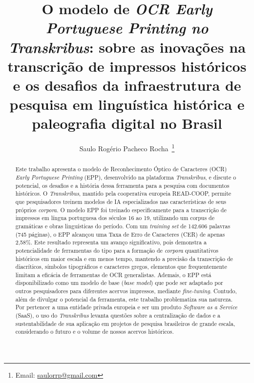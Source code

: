 \documentclass[portuguese]{textolivre}
\title{O modelo de \textit{OCR Early Portuguese Printing no Transkribus}: sobre as inovações na transcrição de impressos históricos e os desafios da infraestrutura de pesquisa em linguística histórica e paleografia digital no Brasil}
\author[1]{Saulo Rogério Pacheco Rocha~\orcid{0000-0003-3715-6706}\thanks{Email: \href{mailto:saulorrp@gmail.com}{saulorrp@gmail.com}}}
\affil[1]{Universidade Federal de Santa Catarina, Centro de Comunicação e Expressão, Programa de Pós-Graduação em Linguística, Florianópolis, SC, Brasil.}
\begin{document}
\maketitle

\begin{polyabstract}
\begin{abstract}
Este trabalho apresenta o modelo de Reconhecimento Óptico de Caracteres (OCR) \textit{Early Portuguese Printing} (EPP), desenvolvido na plataforma \textit{Transkribus}, e discute o potencial, os desafios e a história dessa ferramenta para a pesquisa com documentos históricos. O \textit{Transkribus}, mantido pela cooperativa europeia READ-COOP, permite que pesquisadores treinem modelos de IA especializados nas características de seus próprios \textit{corpora}. O modelo EPP foi treinado especificamente para a transcrição de impressos em língua portuguesa dos séculos 16 ao 19, utilizando um corpus de gramáticas e obras linguísticas do período. Com um \textit{training set} de 142.606 palavras (745 páginas), o EPP alcançou uma Taxa de Erro de Caracteres (CER) de apenas 2,58\%. Este resultado representa um avanço significativo, pois demonstra a potencialidade de ferramentas do tipo para a formação de \textit{corpora} quantitativos históricos em maior escala e em menos tempo, mantendo a precisão da transcrição de diacríticos, símbolos tipográficos e caracteres gregos, elementos que frequentemente limitam a eficácia de ferramentas de OCR generalistas. Ademais, o EPP está disponibilizado como um modelo de base (\textit{base model}) que pode ser adaptado por outros pesquisadores para diferentes acervos impressos, mediante \textit{fine-tuning}. Contudo, além de divulgar o potencial da ferramenta, este trabalho problematiza sua natureza. Por pertencer a uma entidade privada europeia e ser um produto \textit{Software as a Service} (SaaS), o uso do \textit{Transkribus} levanta questões sobre a centralização de dados e a sustentabilidade de sua aplicação em projetos de pesquisa brasileiros de grande escala, considerando o futuro e o volume de nossos acervos históricos.

\end{abstract}


\end{polyabstract}
\end{document}
